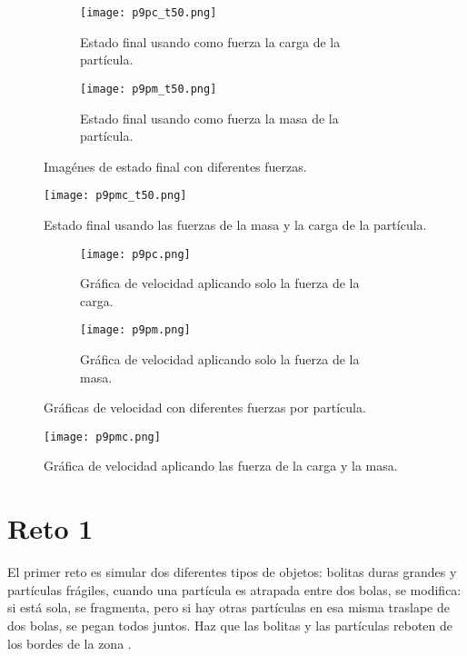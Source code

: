 \documentclass{article}
\begin{document}
\begin{figure}[H]
\centering
\begin{subfigure}[b]{0.40\linewidth}
\texttt{[image: p9pc\_t50.png]}
\caption{Estado final usando como fuerza la carga de la partícula.}
\end{subfigure}
\begin{subfigure}[b]{0.40\linewidth}
\texttt{[image: p9pm\_t50.png]}
\caption{Estado final usando como fuerza la masa de la partícula.}
\end{subfigure}
\caption{Imagénes de estado final con diferentes fuerzas.}
\label{fig:westminster}
\end{figure}


\begin{figure}[H]
\centering
\texttt{[image: p9pmc\_t50.png]}
\caption{\label{fig3} Estado final usando las fuerzas de la masa y la carga de la partícula.}
\end{figure}

\begin{figure}[H]
\centering
\begin{subfigure}[b]{0.40\linewidth}
\texttt{[image: p9pc.png]}
\caption{Gráfica de velocidad aplicando solo la fuerza de la carga.}
\end{subfigure}
\begin{subfigure}[b]{0.40\linewidth}
\texttt{[image: p9pm.png]}
\caption{Gráfica de velocidad aplicando solo la fuerza de la masa.}
\end{subfigure}
\caption{Gráficas de velocidad con diferentes fuerzas por partícula.}
\label{fig:westminster}
\end{figure}

\begin{figure}[H]
\centering
\texttt{[image: p9pmc.png]}
\caption{\label{fig3} Gráfica de velocidad aplicando las fuerza de la carga y la masa.}
\end{figure}

\section{Reto 1}
El primer reto es simular dos diferentes tipos de objetos: bolitas duras grandes y partículas frágiles, cuando una partícula es atrapada entre dos bolas, se modifica: si está sola, se fragmenta, pero si hay otras partículas en esa misma traslape de dos bolas, se pegan todos juntos. Haz que las bolitas y las partículas reboten de los bordes de la zona \cite{Satu_Elisa_Schaeffer}.
\end{document}
